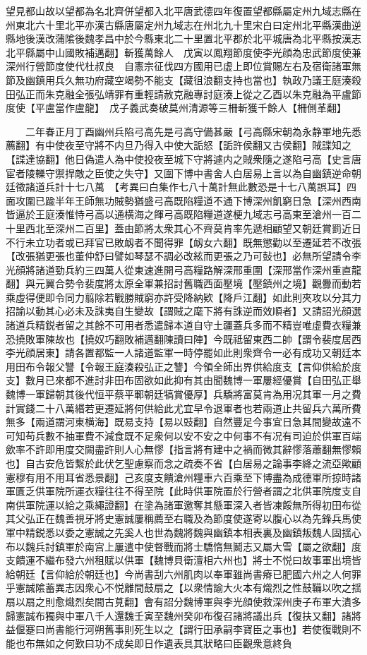 望見都山故以望都為名北齊併望都入北平唐武德四年復置望都縣屬定州九域志縣在州東北六十里北平亦漢古縣唐屬定州九域志在州北九十里宋白曰定州北平縣漢曲逆縣地後漢改蒲隂後魏孝昌中於今縣東北二十里置北平郡於北平城唐為北平縣按漢志北平縣屬中山國敗補邁翻】斬獲萬餘人　戊寅以鳳翔節度使李光顔為忠武節度使兼深州行營節度使代杜叔良　自憲宗征伐四方國用已虚上即位賞賜左右及宿衛諸軍無節及幽鎮用兵久無功府藏空竭勢不能支【藏徂浪翻支持也當也】執政乃議王庭湊殺田弘正而朱克融全張弘靖罪有重輕請赦克融專討庭湊上從之乙酉以朱克融為平盧節度使【平盧當作盧龍】　戊子義武奏破莫州清源等三柵斬獲千餘人【柵側革翻】

　　二年春正月丁酉幽州兵陷弓高先是弓高守備甚嚴【弓高縣宋朝為永静軍地先悉薦翻】有中使夜至守將不内旦乃得入中使大詬怒【詬許侯翻又古侯翻】賊諜知之【諜達協翻】他日偽遣人為中使投夜至城下守將遽内之賊衆隨之遂陷弓高【史言唐宦者陵轢守禦捍敵之臣使之失守】又圍下博中書舍人白居易上言以為自幽鎮逆命朝廷徵諸道兵計十七八萬　【考異曰白集作七八十萬計無此數恐是十七八萬誤耳】四面攻圍已踰半年王師無功賊勢猶盛弓高既陷糧道不通下博深州飢窮日急【深州西南皆逼於王庭湊惟恃弓高以通横海之餫弓高既陷糧道遂梗九域志弓高東至滄州一百二十里西北至深州二百里】蓋由節將太衆其心不齊莫肯率先遞相顧望又朝廷賞罰近日不行未立功者或已拜官已敗衂者不聞得罪【衂女六翻】既無懲勸以至遷延若不改張【改張猶更張也董仲舒曰譬如琴瑟不調必改絃而更張之乃可鼔也】必無所望請令李光顔將諸道勁兵約三四萬人從東速進開弓高糧路解深邢重圍【深邢當作深州重直龍翻】與元翼合勢令裴度將太原全軍兼招討舊職西面壓境【壓鎮州之境】觀釁而動若乘虛得便即令同力翦除若戰勝賊窮亦許受降納欵【降戶江翻】如此則夾攻以分其力招諭以動其心必未及誅夷自生變故【謂賊之麾下將有誅逆而效順者】又請詔光顔選諸道兵精鋭者留之其餘不可用者悉遣歸本道自守土疆蓋兵多而不精豈唯虛費衣糧兼恐撓敗軍陳故也【撓奴巧翻敗補邁翻陳讀曰陣】今既祗留東西二帥【謂令裴度居西李光顔居東】請各置都監一人諸道監軍一時停罷如此則衆齊令一必有成功又朝廷本用田布令報父讐【令報王庭湊殺弘正之讐】今領全師出界供給度支【言仰供給於度支】數月已來都不進討非田布固欲如此抑有其由聞魏博一軍屢經優賞【自田弘正舉魏博一軍歸朝其後代恒平蔡平鄆朝廷犒賞優厚】兵驕將富莫肯為用况其軍一月之費計實錢二十八萬緡若更遷延將何供給此尤宜早令退軍者也若兩道止共留兵六萬所費無多【兩道謂河東横海】既易支持【易以豉翻】自然豐足今事宜日急其間變故遠不可知苟兵數不抽軍費不減食既不足衆何以安不安之中何事不有况有司迫於供軍百端歛率不許即用度交闕盡許則人心無憀【指言將有建中之禍而微其辭憀落蕭翻無憀賴也】自古安危皆繫於此伏乞聖慮察而念之疏奏不省【白居易之論事李絳之流亞歟顧憲穆有用不用耳省悉景翻】己亥度支饋滄州糧車六百乘至下博盡為成德軍所掠時諸軍匱乏供軍院所運衣糧往往不得至院【此時供軍院置於行營者謂之北供軍院度支自南供軍院運以給之乘繩證翻】在塗為諸軍邀奪其懸軍深入者皆凍餒無所得初田布從其父弘正在魏善視牙將史憲誠屢稱薦至右職及為節度使遂寄以腹心以為先鋒兵馬使軍中精鋭悉以委之憲誠之先奚人也世為魏將魏與幽鎮本相表裏及幽鎮叛魏人固揺心布以魏兵討鎮軍於南宫上屢遣中使督戰而將士驕惰無鬭志又屬大雪【屬之欲翻】度支饋運不繼布發六州租賦以供軍【魏博貝衛澶相六州也】將士不悦曰故事軍出境皆給朝廷【言仰給於朝廷也】今尚書刮六州肌肉以奉軍雖尚書瘠已肥國六州之人何罪乎憲誠隂蓄異志因衆心不悦離間鼓扇之【以衆情諭大火本有熾烈之性鼓鞴以吹之揺扇以扇之則愈熾烈矣間古莧翻】會有詔分魏博軍與李光顔使救深州庚子布軍大潰多歸憲誠布獨與中軍八千人還魏壬寅至魏州癸卯布復召諸將議出兵【復扶又翻】諸將益偃蹇曰尚書能行河朔舊事則死生以之【謂行田承嗣李寶臣之事也】若使復戰則不能也布無如之何歎曰功不成矣即日作遺表具其狀略曰臣觀衆意終負